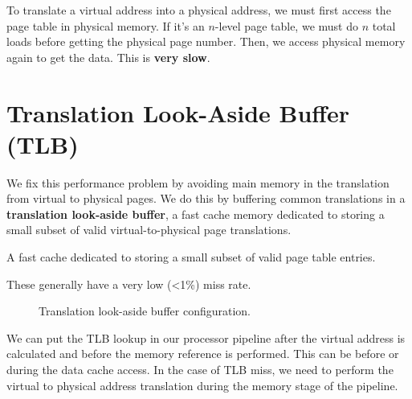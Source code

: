 \newpage
{}
To translate a virtual address into a physical address, we must first access the page table in physical memory. If it's an \(n\)-level page table, we must do \(n\) total loads before getting the physical page number. Then, we access physical memory again to get the data. This is \textbf{very slow}.

\section{Translation Look-Aside Buffer (TLB)}
We fix this performance problem by avoiding main memory in the translation from virtual to physical pages. We do this by buffering common translations in a \textbf{translation look-aside buffer}, a fast cache memory dedicated to storing a small subset of valid virtual-to-physical page translations.

\begin{definition}
  A fast cache dedicated to storing a small subset of valid page table entries.
  \begin{remark}
    These generally have a very low (<1\%) miss rate.
  \end{remark}
\end{definition}

\begin{figure}[H]
  \centering
  \caption{Translation look-aside buffer configuration.}
  \label{fig:tlb}
\end{figure}

We can put the TLB lookup in our processor pipeline after the virtual address is calculated and before the memory reference is performed. This can be before or during the data cache access. In the case of TLB miss, we need to perform the virtual to physical address translation during the memory stage of the pipeline.